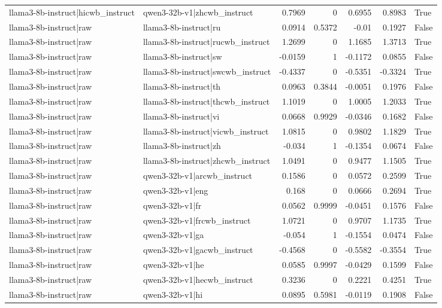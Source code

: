 \begin{table}
\begin{tabular}{l l r r r r l}
llama3-8b-instruct|hicwb_instruct & qwen3-32b-v1|zhcwb_instruct & 0.7969 & 0 & 0.6955 & 0.8983 & True \\
llama3-8b-instruct|raw & llama3-8b-instruct|ru & 0.0914 & 0.5372 & -0.01 & 0.1927 & False \\
llama3-8b-instruct|raw & llama3-8b-instruct|rucwb_instruct & 1.2699 & 0 & 1.1685 & 1.3713 & True \\
llama3-8b-instruct|raw & llama3-8b-instruct|sw & -0.0159 & 1 & -0.1172 & 0.0855 & False \\
llama3-8b-instruct|raw & llama3-8b-instruct|swcwb_instruct & -0.4337 & 0 & -0.5351 & -0.3324 & True \\
llama3-8b-instruct|raw & llama3-8b-instruct|th & 0.0963 & 0.3844 & -0.0051 & 0.1976 & False \\
llama3-8b-instruct|raw & llama3-8b-instruct|thcwb_instruct & 1.1019 & 0 & 1.0005 & 1.2033 & True \\
llama3-8b-instruct|raw & llama3-8b-instruct|vi & 0.0668 & 0.9929 & -0.0346 & 0.1682 & False \\
llama3-8b-instruct|raw & llama3-8b-instruct|vicwb_instruct & 1.0815 & 0 & 0.9802 & 1.1829 & True \\
llama3-8b-instruct|raw & llama3-8b-instruct|zh & -0.034 & 1 & -0.1354 & 0.0674 & False \\
llama3-8b-instruct|raw & llama3-8b-instruct|zhcwb_instruct & 1.0491 & 0 & 0.9477 & 1.1505 & True \\
llama3-8b-instruct|raw & qwen3-32b-v1|arcwb_instruct & 0.1586 & 0 & 0.0572 & 0.2599 & True \\
llama3-8b-instruct|raw & qwen3-32b-v1|eng & 0.168 & 0 & 0.0666 & 0.2694 & True \\
llama3-8b-instruct|raw & qwen3-32b-v1|fr & 0.0562 & 0.9999 & -0.0451 & 0.1576 & False \\
llama3-8b-instruct|raw & qwen3-32b-v1|frcwb_instruct & 1.0721 & 0 & 0.9707 & 1.1735 & True \\
llama3-8b-instruct|raw & qwen3-32b-v1|ga & -0.054 & 1 & -0.1554 & 0.0474 & False \\
llama3-8b-instruct|raw & qwen3-32b-v1|gacwb_instruct & -0.4568 & 0 & -0.5582 & -0.3554 & True \\
llama3-8b-instruct|raw & qwen3-32b-v1|he & 0.0585 & 0.9997 & -0.0429 & 0.1599 & False \\
llama3-8b-instruct|raw & qwen3-32b-v1|hecwb_instruct & 0.3236 & 0 & 0.2221 & 0.4251 & True \\
llama3-8b-instruct|raw & qwen3-32b-v1|hi & 0.0895 & 0.5981 & -0.0119 & 0.1908 & False \\

\end{tabular}
\end{table}
